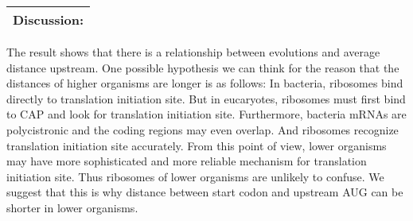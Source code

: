 \vspace{2ex}
\noindent
\begin{tabular}{|l|}
\hline
Discussion:\\
\hline
\end{tabular}

The result shows that there is a relationship between evolutions
and average distance upstream. 
One possible hypothesis we can
think for the reason 
that the distances of higher organisms are longer is as follows:
In bacteria, ribosomes bind directly to translation initiation site.
But in eucaryotes, ribosomes must first bind to CAP and look for
translation initiation site. Furthermore, bacteria mRNAs are
polycistronic and the coding regions may even overlap. And ribosomes
recognize translation initiation site accurately. From this point of
view, lower organisms 
may have more sophisticated and more reliable mechanism for translation 
initiation site. Thus ribosomes of lower organisms are unlikely to
confuse. 
We suggest that this is why distance between start codon and upstream 
AUG can be shorter in lower organisms.











